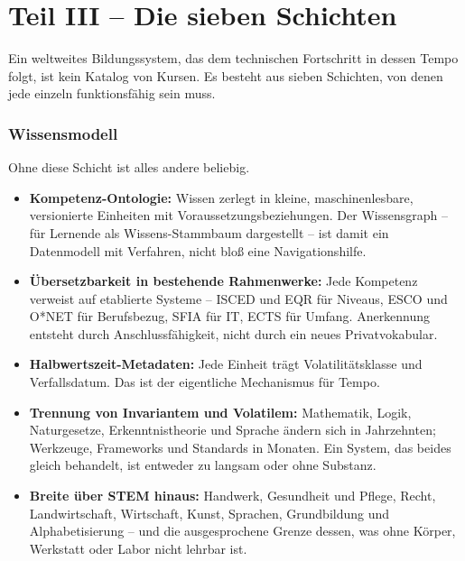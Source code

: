 \documentclass[11pt,a4paper]{article}
\newcommand{\teilnummerierung}[1]{%
    \setcounter{section}{0}%
    \renewcommand{\thesection}{#1.\arabic{section}}%
    \renewcommand{\theHsection}{#1.\arabic{section}}%
}
\begin{document}
\part*{Teil III -- Die sieben Schichten}
\teilnummerierung{III}

\noindent Ein weltweites Bildungssystem, das dem technischen Fortschritt in dessen Tempo folgt, ist kein Katalog von Kursen. Es besteht aus sieben Schichten, von denen jede einzeln funktionsfähig sein muss.

\section{Wissensmodell}
Ohne diese Schicht ist alles andere beliebig.
\begin{itemize}[label=--]
    \item \textbf{Kompetenz-Ontologie:} Wissen zerlegt in kleine, maschinenlesbare, versionierte Einheiten mit Voraussetzungsbeziehungen. Der Wissensgraph -- für Lernende als Wissens-Stammbaum dargestellt -- ist damit ein Datenmodell mit Verfahren, nicht bloß eine Navigationshilfe.
    \item \textbf{Übersetzbarkeit in bestehende Rahmenwerke:} Jede Kompetenz verweist auf etablierte Systeme -- ISCED und EQR für Niveaus, ESCO und O*NET für Berufsbezug, SFIA für IT, ECTS für Umfang. Anerkennung entsteht durch Anschlussfähigkeit, nicht durch ein neues Privatvokabular.
    \item \textbf{Halbwertszeit-Metadaten:} Jede Einheit trägt Volatilitätsklasse und Verfallsdatum. Das ist der eigentliche Mechanismus für Tempo.
    \item \textbf{Trennung von Invariantem und Volatilem:} Mathematik, Logik, Naturgesetze, Erkenntnistheorie und Sprache ändern sich in Jahrzehnten; Werkzeuge, Frameworks und Standards in Monaten. Ein System, das beides gleich behandelt, ist entweder zu langsam oder ohne Substanz.
    \item \textbf{Breite über STEM hinaus:} Handwerk, Gesundheit und Pflege, Recht, Landwirtschaft, Wirtschaft, Kunst, Sprachen, Grundbildung und Alphabetisierung -- und die ausgesprochene Grenze dessen, was ohne Körper, Werkstatt oder Labor nicht lehrbar ist.
\end{itemize}
\end{document}
